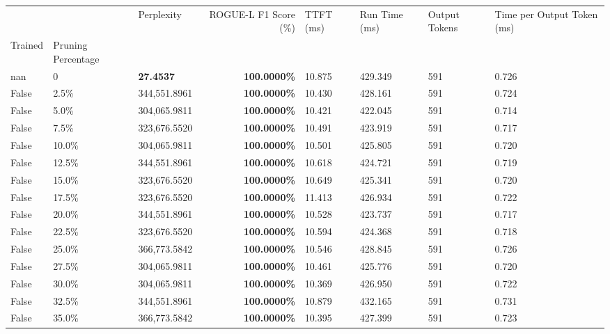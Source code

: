 \begin{table}[H]
\label{tab:evaluation-pipeline-4-untrained}
\begin{tabular}{lllrllll}
\toprule
 &  & Perplexity & ROGUE-L F1 Score (\%) & TTFT (ms) & Run Time (ms) & Output Tokens & Time per Output Token (ms) \\
Trained & Pruning Percentage &  &  &  &  &  &  \\
\midrule
nan & 0 & \bfseries 27.4537 & \bfseries 100.0000\% & 10.875 & 429.349 & 591 & 0.726 \\
\cline{1-8}
False & 2.5\% & 344,551.8961 & \bfseries \color{red} 100.0000\% & 10.430 & 428.161 & 591 & 0.724 \\
\cline{1-8}
False & 5.0\% & 304,065.9811 & \bfseries \color{red} 100.0000\% & 10.421 & 422.045 & 591 & 0.714 \\
\cline{1-8}
False & 7.5\% & 323,676.5520 & \bfseries \color{red} 100.0000\% & 10.491 & 423.919 & 591 & 0.717 \\
\cline{1-8}
False & 10.0\% & 304,065.9811 & \bfseries \color{red} 100.0000\% & 10.501 & 425.805 & 591 & 0.720 \\
\cline{1-8}
False & 12.5\% & 344,551.8961 & \bfseries \color{red} 100.0000\% & 10.618 & 424.721 & 591 & 0.719 \\
\cline{1-8}
False & 15.0\% & 323,676.5520 & \bfseries \color{red} 100.0000\% & 10.649 & 425.341 & 591 & 0.720 \\
\cline{1-8}
False & 17.5\% & 323,676.5520 & \bfseries \color{red} 100.0000\% & 11.413 & 426.934 & 591 & 0.722 \\
\cline{1-8}
False & 20.0\% & 344,551.8961 & \bfseries \color{red} 100.0000\% & 10.528 & 423.737 & 591 & 0.717 \\
\cline{1-8}
False & 22.5\% & 323,676.5520 & \bfseries \color{red} 100.0000\% & 10.594 & 424.368 & 591 & 0.718 \\
\cline{1-8}
False & 25.0\% & 366,773.5842 & \bfseries \color{red} 100.0000\% & 10.546 & 428.845 & 591 & 0.726 \\
\cline{1-8}
False & 27.5\% & 304,065.9811 & \bfseries \color{red} 100.0000\% & 10.461 & 425.776 & 591 & 0.720 \\
\cline{1-8}
False & 30.0\% & 304,065.9811 & \bfseries \color{red} 100.0000\% & 10.369 & 426.950 & 591 & 0.722 \\
\cline{1-8}
False & 32.5\% & 344,551.8961 & \bfseries \color{red} 100.0000\% & 10.879 & 432.165 & 591 & 0.731 \\
\cline{1-8}
False & 35.0\% & 366,773.5842 & \bfseries \color{red} 100.0000\% & 10.395 & 427.399 & 591 & 0.723 \\

\end{tabular}
\end{table}
